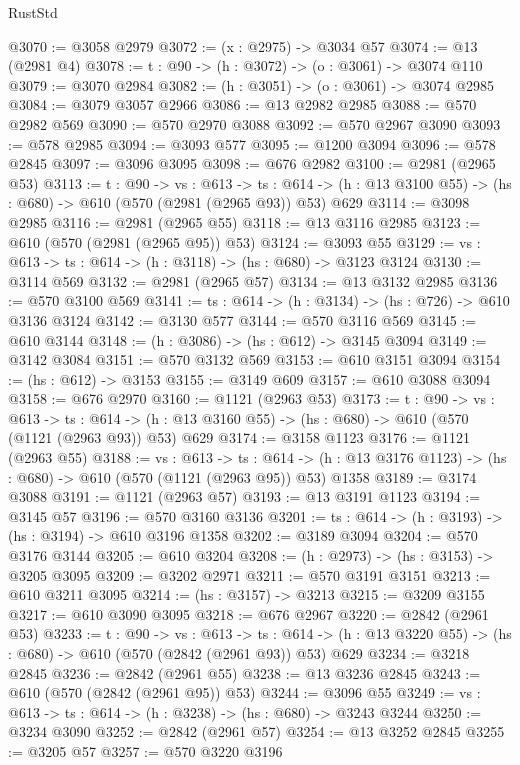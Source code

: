 \begin{lexlean}{RustStd}
\begin{coremodule}
@3070 := @3058 @2979
@3072 := (x : @2975) -> @3034 @57
@3074 := @13 (@2981 @4)
@3078 := {t : @90} -> (h : @3072) -> (o : @3061) -> @3074 @110
@3079 := @3070 @2984
@3082 := (h : @3051) -> (o : @3061) -> @3074 @2985
@3084 := @3079 @3057 @2966
@3086 := @13 @2982 @2985
@3088 := @570 @2982 @569
@3090 := @570 @2970 @3088
@3092 := @570 @2967 @3090
@3093 := @578 @2985
@3094 := @3093 @577
@3095 := @1200 @3094
@3096 := @578 @2845
@3097 := @3096 @3095
@3098 := @676 @2982
@3100 := @2981 (@2965 @53)
@3113 := {t : @90} ->
  {vs : @613} ->
  {ts : @614} -> (h : @13 @3100 @55) -> (hs : @680) -> @610 (@570 (@2981 (@2965 @93)) @53) @629
@3114 := @3098 @2985
@3116 := @2981 (@2965 @55)
@3118 := @13 @3116 @2985
@3123 := @610 (@570 (@2981 (@2965 @95)) @53)
@3124 := @3093 @55
@3129 := {vs : @613} -> {ts : @614} -> (h : @3118) -> (hs : @680) -> @3123 @3124
@3130 := @3114 @569
@3132 := @2981 (@2965 @57)
@3134 := @13 @3132 @2985
@3136 := @570 @3100 @569
@3141 := {ts : @614} -> (h : @3134) -> (hs : @726) -> @610 @3136 @3124
@3142 := @3130 @577
@3144 := @570 @3116 @569
@3145 := @610 @3144
@3148 := (h : @3086) -> (hs : @612) -> @3145 @3094
@3149 := @3142 @3084
@3151 := @570 @3132 @569
@3153 := @610 @3151 @3094
@3154 := (hs : @612) -> @3153
@3155 := @3149 @609
@3157 := @610 @3088 @3094
@3158 := @676 @2970
@3160 := @1121 (@2963 @53)
@3173 := {t : @90} ->
  {vs : @613} ->
  {ts : @614} -> (h : @13 @3160 @55) -> (hs : @680) -> @610 (@570 (@1121 (@2963 @93)) @53) @629
@3174 := @3158 @1123
@3176 := @1121 (@2963 @55)
@3188 := {vs : @613} ->
  {ts : @614} -> (h : @13 @3176 @1123) -> (hs : @680) -> @610 (@570 (@1121 (@2963 @95)) @53) @1358
@3189 := @3174 @3088
@3191 := @1121 (@2963 @57)
@3193 := @13 @3191 @1123
@3194 := @3145 @57
@3196 := @570 @3160 @3136
@3201 := {ts : @614} -> (h : @3193) -> (hs : @3194) -> @610 @3196 @1358
@3202 := @3189 @3094
@3204 := @570 @3176 @3144
@3205 := @610 @3204
@3208 := (h : @2973) -> (hs : @3153) -> @3205 @3095
@3209 := @3202 @2971
@3211 := @570 @3191 @3151
@3213 := @610 @3211 @3095
@3214 := (hs : @3157) -> @3213
@3215 := @3209 @3155
@3217 := @610 @3090 @3095
@3218 := @676 @2967
@3220 := @2842 (@2961 @53)
@3233 := {t : @90} ->
  {vs : @613} ->
  {ts : @614} -> (h : @13 @3220 @55) -> (hs : @680) -> @610 (@570 (@2842 (@2961 @93)) @53) @629
@3234 := @3218 @2845
@3236 := @2842 (@2961 @55)
@3238 := @13 @3236 @2845
@3243 := @610 (@570 (@2842 (@2961 @95)) @53)
@3244 := @3096 @55
@3249 := {vs : @613} -> {ts : @614} -> (h : @3238) -> (hs : @680) -> @3243 @3244
@3250 := @3234 @3090
@3252 := @2842 (@2961 @57)
@3254 := @13 @3252 @2845
@3255 := @3205 @57
@3257 := @570 @3220 @3196

\end{coremodule}
\end{lexlean}

